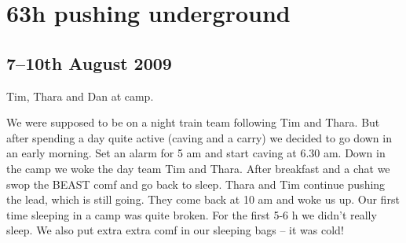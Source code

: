 \section{63h pushing underground}
\subsection{7--10th August 2009}


\begin{marginfigure}
\checkoddpage \ifoddpage \forcerectofloat \else \forceversofloat \fi
\centering
 \caption{Tim, Thara and Dan at camp. }
 \label{Thara Tim Dan Metal}
\end{marginfigure}


We were supposed to be on a night train team following Tim and Thara. But
after spending a day quite active (caving and a carry) we decided to go
down in an early morning. Set an alarm for 5 am and start caving at 6.30
am. Down in the camp we woke the day team Tim and Thara. After breakfast
and a chat we swop the BEAST comf and go back to sleep. Thara and Tim
continue pushing the lead, which is still going. They come back at 10 am
and woke us up. Our first time sleeping in a camp was quite broken. For
the first 5-6 h we didn't really sleep. We also put extra extra comf in
our sleeping bags -- it was cold!

